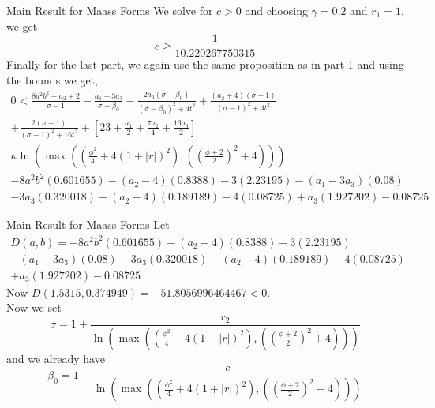 \documentclass{beamer}
\begin{document}
\begin{frame}{Main Result for Maass Forms}
    We solve for $c>0$ and choosing $\gamma = 0.2$ and $r_1 = 1$, we get 
\[
c\geq \frac{1}{10.220267750315 }
\]
    Finally for the last part, we again use the same proposition as in part 1 and using the bounds we get,
    \begin{multline*}
    0 < \frac{8a^2b^2+a_2+2}{\sigma-1} - \frac{a_1+3a_3}{\sigma-\beta_0} - \frac{2a_3(\sigma-\beta_0)}{(\sigma-\beta_0)^2+4t^2} +\frac{(a_2+4)(\sigma-1)}{(\sigma-1)^2 + 4t^2}\\ + \frac{2(\sigma-1)}{(\sigma-1)^2 + 16t^2}+ \left[ 23+\frac{a_1}{2}+\frac{7a_2}{4} + \frac{13a_3}{2}\right]\\\kappa\ln\left(\max \left(\left( \frac{\phi^2}{4} + 4(1+|r|)^2\right),\left( \left(\frac{\phi+2}{2}\right)^2 +4 \right) \right)\right)  \\ -8a^2b^2(0.601655) -(a_2-4)(0.8388)-3(2.23195) -(a_1-3a_3)(0.08)\\ -3a_3(0.320018)-(a_2-4)(0.189189) - 4(0.08725) +a_3(1.927202)-0.08725
\end{multline*}

\end{frame}
\begin{frame}{Main Result for Maass Forms}
    Let 
\begin{multline*}
    D(a,b) = -8a^2b^2(0.601655) -(a_2-4)(0.8388)-3(2.23195)\\ -(a_1-3a_3)(0.08) -3a_3(0.320018)-(a_2-4)(0.189189) - 4(0.08725) \\+a_3(1.927202)-0.08725
\end{multline*}
Now $D(1.5315,0.374949) = -51.8056996464467< 0 $.\\
    Now we set  \[
\sigma = 1+\frac{r_2}{\ln\left(\max \left(\left( \frac{\phi^2}{4} + 4(1+|r|)^2\right),\left( \left(\frac{\phi+2}{2}\right)^2 +4 \right) \right)\right) }
\] and we already have 
\[
\beta_0 = 1-\frac{c}{\ln\left(\max \left(\left( \frac{\phi^2}{4} + 4(1+|r|)^2\right),\left( \left(\frac{\phi+2}{2}\right)^2 +4 \right) \right)\right) }
\]
\end{frame}
\end{document}
